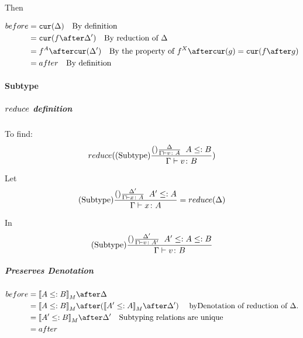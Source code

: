 {                Then

                \begin{align}
                    before & = \cur{\D} \qt{By definition}\\
                            & = \cur{f\after\D'} \qt{By reduction of $\D$} \\
                            & = f^A\after\cur{\D'}\qt{By the property of $f^X\after\cur{g} = \cur{f\after g}$} \\
                            & = after \qt{By definition}\\
                \end{align}

            \paragraph{Subtype}
            \subparagraph{$reduce$ definition}
            To find:
            \begin{equation}
                reduce((\text{Subtype}) \frac{(\text{}) \frac{\Delta}{\Gamma \vdash v \colon A}\;\; A \leq: B}{\Gamma \vdash v \colon B})
            \end{equation}

            Let 
            \begin{equation}\label{SubtypeDeltaReduction}
                (\text{Subtype}) \frac{(\text{}) \frac{\Delta'}{\Gamma \vdash x \colon A}\;\; A'\leq: A}{\Gamma \vdash x \colon A} = reduce(\Delta)
            \end{equation}

            In 
            \begin{equation}
                (\text{Subtype}) \frac{
                    (\text{}) \frac{\Delta'}{\Gamma \vdash v \colon A'}
                \;\;
                A' \leq: A \leq: B
                }{\Gamma \vdash v \colon B}
            \end{equation}

            \subparagraph{Preserves Denotation}
                \begin{align}
                    before & = \deno{A \subtype B} \after \D \\
                    & = \deno{A \subtype B} \after (\deno{A' \subtype A} \after \D') \qt{ byDenotation of reduction of $\D$.}\\
                    & = \deno{A' \subtype B} \after \D'\qt{Subtyping relations are unique} \\
                    & = after \\
                \end{align}
}
